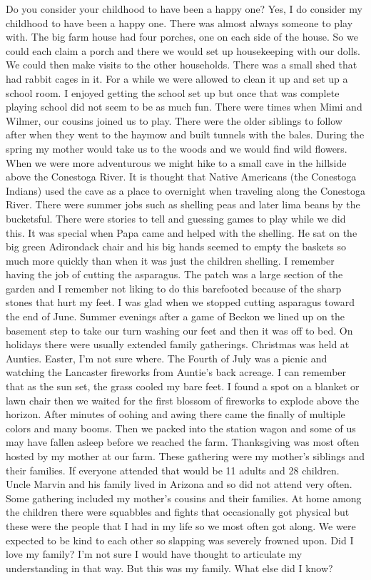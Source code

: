 Do you consider your childhood to have been a happy one?
Yes, I do consider my childhood to have been a happy one. There was almost always someone to play with. The big farm house had four porches, one on each side of the house. So we could each claim a porch and there we would set up housekeeping with our dolls. We could then make visits to the other households. There was a small shed that had rabbit cages in it. For a while we were allowed to clean it up and set up a school room. I enjoyed getting the school set up but once that was complete playing school did not seem to be as much fun. There were times when Mimi and Wilmer, our cousins joined us to play. 
There were the older siblings to follow after when they went to the haymow and built tunnels with the bales. During the spring my mother would take us to the woods and we would find wild flowers. When we were more adventurous we might hike to a small cave in the hillside above the Conestoga River.  It is thought that Native Americans (the Conestoga Indians) used the cave as a place to overnight when traveling along the Conestoga River. 
There were summer jobs such as shelling peas and later lima beans by the bucketsful. There were stories to tell and guessing games to play while we did this. It was special when Papa came and helped with the shelling. He sat on the big green Adirondack chair and his big hands seemed to empty the baskets so much more quickly than when it was just the children shelling. I remember having the job of cutting the asparagus. The patch was a large section of the garden and I remember not liking to do this barefooted because of the sharp stones that hurt my feet. I was glad when we stopped cutting asparagus toward the end of June. Summer evenings after a game of Beckon we lined up on the basement step to take our turn washing our feet and then it was off to bed.
On holidays there were usually extended family gatherings. Christmas was held at Aunties. Easter, I'm not sure where. The Fourth of July was a picnic and watching the Lancaster fireworks from Auntie's back acreage. I can remember that as the sun set, the grass cooled my bare feet. I found a spot on a blanket or lawn chair then we waited for the first blossom of fireworks to explode above the horizon. After minutes of oohing and awing there came the finally of multiple colors and many booms. Then we packed into the station wagon and some of us may have fallen asleep before we reached the farm.
Thanksgiving was most often hosted by my mother at our farm. These gathering were my mother's siblings and their families. If everyone attended that would be 11 adults and 28 children. Uncle Marvin and his family lived in Arizona and so did not attend very often. Some gathering included my mother's cousins and their families.
At home among the children there were squabbles and fights that occasionally got physical but these were the people that I had in my life so we most often got along. We were expected to be kind to each other so slapping was severely frowned upon. Did I love my family? I'm not sure I would have thought to articulate my understanding in that way. But this was my family. What else did I know?




